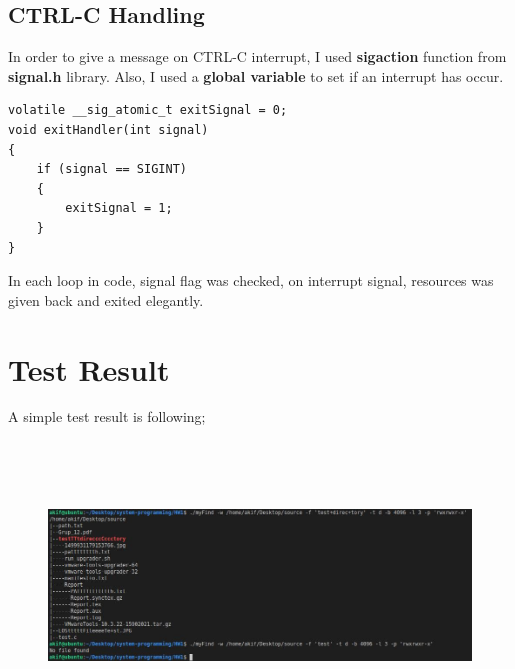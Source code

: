 \documentclass{article}
\begin{document}
\subsection{CTRL-C Handling}
In order to give a message on CTRL-C interrupt, I used \textbf{sigaction} function from \textbf{signal.h} library.
Also, I used a \textbf{global variable} to set if an interrupt has occur.
\begin{lstlisting}[style=CStyle]
volatile __sig_atomic_t exitSignal = 0;
void exitHandler(int signal)
{
    if (signal == SIGINT)
    {
        exitSignal = 1;
    }
}
\end{lstlisting}
In each loop in code, signal flag was checked, on interrupt signal, resources was given back and exited elegantly.
\section{Test Result}
A simple test result is following;
\begin{figure}[H]

	\includegraphics[width=7in, height=3in]{result.JPG}
	\caption[Optional caption]{}
	\label{}
\end{figure}                              
\end{document}
